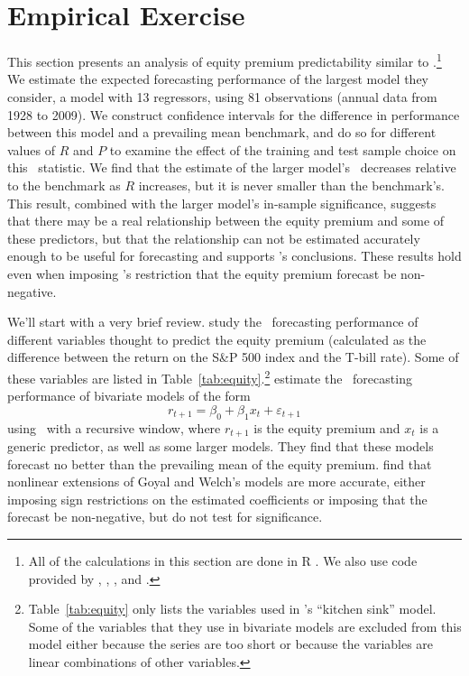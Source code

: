 \documentclass[11pt]{article}
\newcommand{\e}{\varepsilon}
\newcommand{\citepos}[1]{\citeauthor{#1}'s \citeyearpar{#1}}
\begin{document}
\section{Empirical Exercise}\label{sec:empirics}
This section presents an analysis of equity premium predictability
similar to \citet{GoW:08}.\footnote{All of the calculations in this
  section are done in R \citep{Rde:10}.  We also use code provided by
  \citet{Zeh:02}, \citet{Zei:04}, \citet{Har:10}, and
  \citet{ShB:11:0.6.1}.}  We estimate the expected forecasting
performance of the largest model they consider, a model with 13
regressors, using 81 observations (annual data from 1928 to 2009).  We
construct confidence intervals for the difference in performance
between this model and a prevailing mean benchmark, and do so for
different values of $R$ and $P$ to examine the effect of the training
and test sample choice on this \oos\ statistic.  We find that the
estimate of the larger model's \mse\ decreases relative to the
benchmark as $R$ increases, but it is never smaller than the
benchmark's.  This result, combined with the larger model's in-sample
significance, suggests that there may be a real relationship between
the equity premium and some of these predictors, but that the
relationship can not be estimated accurately enough to be useful for
forecasting and supports \citepos{GoW:08} conclusions.  These results
hold even when imposing \citepos{CaT:08} restriction that the equity
premium forecast be non-negative.

We'll start with a very brief review.  \citet{GoW:08}
study the \oos\ forecasting performance of different variables thought
to predict the equity premium (calculated as the difference between
the return on the S\&P 500 index and the T-bill rate).  Some of these
variables are listed in
Table~\ref{tab:equity}.\footnote{Table~\ref{tab:equity} only lists the
  variables used in \citepos{GoW:08} ``kitchen sink''
  model.  Some of the variables that they use in bivariate models are
  excluded from this model either because the series are too short or
  because the variables are linear combinations of other variables.}
\citet{GoW:08} estimate the \oos\ forecasting
performance of bivariate models of the form
\[
r_{t+1} = \beta_0 + \beta_1 x_t + \e_{t+1}
\]
using \ols\ with a recursive window, where $r_{t+1}$ is the equity
premium and $x_t$ is a generic predictor, as well as some larger
models.  They find that these models forecast no better than the
prevailing mean of the equity premium.
\citet{CaT:08} find that nonlinear extensions of
Goyal and Welch's models are more accurate, either imposing sign
restrictions on the estimated coefficients or imposing that the
forecast be non-negative, but do not test for significance.
\end{document}
